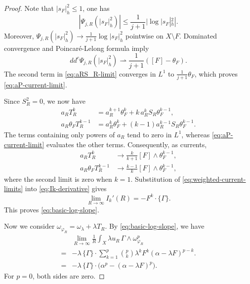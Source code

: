 \documentclass[reqno]{amsart}
\theoremstyle{remark}
\newcommand{\wto}{\rightharpoonup}
\theoremstyle{plain}
\begin{document}
\begin{proof}
Note that $|s_F|_h^2\leq 1$, one has \[
|\Psi_{j,R}(|s_F|_h^2)|\leq \frac{1}{j+1}|\log|s_F|_h^2|.
\] Moreover, $\Psi_{j,R}(|s_F|_h^2)\to \frac{1}{j+1}\log |s_F|_h^2$ pointwise on $X\setminus F$.  Dominated convergence and Poincaré-Lelong formula imply \[
 dd^c \Psi_{j,R}(|s_F|_h^2)\wto \frac{1}{j+1}([F]-\theta_F).
 \]
 The second term in \eqref{eq:aRS_R-limit} converges in $L^1$ to $\frac{1}{j+1}\theta_F$, which proves \eqref{eq:aP-current-limit}.


Since $S_R^2=0$, we now have \[
\begin{aligned}
 a_RT_R^k
 &=a_R^{k+1}\theta_F^k
   +k\,a_R^kS_R\theta_F^{k-1},\\
 a_R\theta_FT_R^{k-1}
 &=a_R^k\theta_F^k
   +(k-1)a_R^{k-1}S_R\theta_F^{k-1}.
\end{aligned}
\]
The terms containing only powers of $a_R$ tend to zero in $L^1$,
whereas \eqref{eq:aP-current-limit} evaluates the other terms.
Consequently, as currents,
\begin{equation}\label{eq:weighted-current-limits}
\begin{aligned}
 a_RT_R^k
 &\longrightarrow\frac{k}{k+1}
       [F]\wedge\theta_F^{k-1},\\
 a_R\theta_FT_R^{k-1}
 &\longrightarrow\frac{k-1}{k}
       [F]\wedge\theta_F^{k-1},
\end{aligned}
\end{equation}
where the second limit is zero when $k=1$.
Substitution of \eqref{eq:weighted-current-limits} into
\eqref{eq:Ik-derivative} gives
\[
 \lim_{R\to\infty}I_k'(R)
 =-F^k\cdot\{\Gamma\}.
\]
This proves \eqref{eq:basic-log-slope}.  

Now we consider $\omega_{\varphi_R}=\omega_\lambda+\lambda T_R$. By \eqref{eq:basic-log-slope}, we have \begin{equation}\label{eq:log-binomial-slope}
\begin{aligned}
 &\lim_{R\to\infty}\frac1R
   \int_X\lambda u_R\,\Gamma
       \wedge\omega_{\varphi_R}^{p}\\
       =&-\lambda\,\{\Gamma\}\cdot
   \sum_{k=1}^{p}\binom pk
       \lambda^kF^k(\alpha-\lambda F)^{p-k}.\\
       =&-\lambda\,\{\Gamma\}\cdot
   \bigl(\alpha^p-(\alpha-\lambda F)^p\bigr).
\end{aligned}
\end{equation}
For $p=0$, both sides are zero.


\end{proof}
\end{document}

